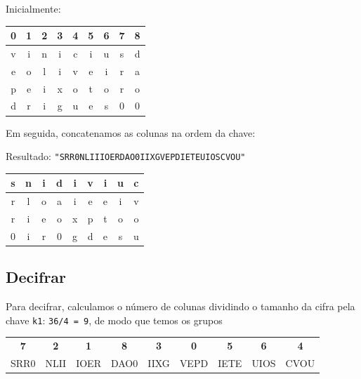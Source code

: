 \documentclass{article}
\begin{document}
    Inicialmente:
    \begin{center}
    \begin{tabular}{|c|c|c|c|c|c|c|c|c|}
       \hline
       \textbf{0} & \textbf{1} & \textbf{2} & \textbf{3} & \textbf{4} & \textbf{5} & \textbf{6} & \textbf{7} & \textbf{8} \\
       \hline
       v & i & n & i & c & i & u & s & d \\ \hline
       e & o & l & i & v & e & i & r & a \\ \hline
       p & e & i & x & o & t & o & r & o \\ \hline
       d & r & i & g & u & e & s & 0 & 0 \\ \hline
    \end{tabular}
    \end{center}

    Em seguida, concatenamos as colunas na ordem da chave:

    Resultado: \texttt{"SRR0NLIIIOERDAO0IIXGVEPDIETEUIOSCVOU"}

    \begin{center}
    \begin{tabular}{|c|c|c|c|c|c|c|c|c|}
       \hline
       s & n & i & d & i & v & i & u & c \\ \hline
       r & l & o & a & i & e & e & i & v \\ \hline
       r & i & e & o & x & p & t & o & o \\ \hline
       0 & i & r & 0 & g & d & e & s & u \\ \hline
    \end{tabular}
    \end{center}


    \subsection*{Decifrar}

    Para decifrar, calculamos o número de colunas dividindo o tamanho da cifra pela chave \texttt{k1}: \texttt{36/4 = 9}, de modo que temos os grupos

    \begin{center}
    \begin{tabular}{|c|c|c|c|c|c|c|c|c|}
       \hline
       \textbf{7} & \textbf{2} & \textbf{1} & \textbf{8} & \textbf{3} & \textbf{0} & \textbf{5} & \textbf{6} & \textbf{4} \\
       SRR0 & NLII & IOER & DAO0 & IIXG & VEPD & IETE & UIOS & CVOU \\ \hline
    \end{tabular}
    \end{center}
\end{document}
